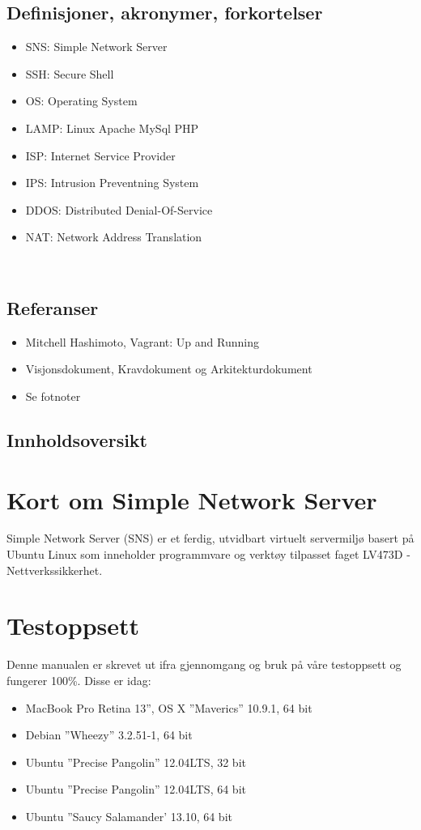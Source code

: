 \documentclass{article}
\begin{document}
\subsection{Definisjoner, akronymer, forkortelser}
\begin{itemize}
\item SNS: Simple Network Server
\item SSH: Secure Shell
\item OS: Operating System
\item LAMP: Linux Apache MySql PHP
\item ISP: Internet Service Provider
\item IPS: Intrusion Preventning System
\item DDOS: Distributed Denial-Of-Service
\item NAT: Network Address Translation
\end{itemize}
\\
\subsection{Referanser}
\begin{itemize}
\item{Mitchell Hashimoto, Vagrant: Up and Running}
\item Visjonsdokument, Kravdokument og Arkitekturdokument
\item Se fotnoter
\end{itemize}
\subsection{Innholdsoversikt}
\section{Kort om Simple Network Server}
Simple Network Server (SNS) er et ferdig, utvidbart virtuelt servermiljø basert på Ubuntu Linux som inneholder programmvare og verktøy tilpasset faget LV473D -Nettverkssikkerhet. 
\section{Testoppsett}
Denne manualen er skrevet ut ifra gjennomgang og bruk på våre testoppsett og fungerer 100\%. Disse er idag: 
\begin{itemize}
\item MacBook Pro Retina 13'', OS X  ''Maverics'' 10.9.1, 64 bit
\item Debian ''Wheezy'' 3.2.51-1, 64 bit
\item Ubuntu ''Precise Pangolin'' 12.04LTS, 32 bit
\item Ubuntu ''Precise Pangolin'' 12.04LTS, 64 bit
\item Ubuntu ''Saucy Salamander' 13.10, 64 bit
\end{itemize}
\end{document}
